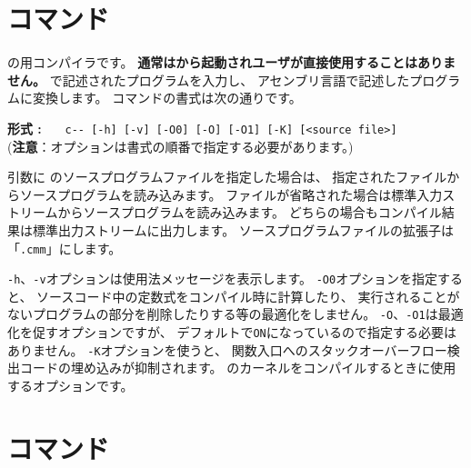 \section{{\cmmc}コマンド}
\label{command:cmmc}

{\cmml}の{\tac}用コンパイラです。
{\bf 通常は{\cme}から起動されユーザが直接使用することはありません。}
\cmml で記述されたプログラムを入力し、
\tac アセンブリ言語で記述したプログラムに変換します。
\cmmc コマンドの書式は次の通りです。

\begin{flushleft}
{\bf 形式 : }~~~\verb/c-- [-h] [-v] [-O0] [-O] [-O1] [-K] [<source file>]/\\
({\bf 注意}：オプションは書式の順番で指定する必要があります。)
\end{flushleft}

引数に \cmml のソースプログラムファイルを指定した場合は、
指定されたファイルからソースプログラムを読み込みます。
ファイルが省略された場合は標準入力ストリームからソースプログラムを読み込みます。
どちらの場合もコンパイル結果は標準出力ストリームに出力します。
ソースプログラムファイルの拡張子は「\verb/.cmm/」にします。

\verb/-h/、\verb/-v/オプションは使用法メッセージを表示します。
\verb/-O0/オプションを指定すると、
ソースコード中の定数式をコンパイル時に計算したり、
実行されることがないプログラムの部分を削除したりする等の最適化をしません。
\verb/-O/、\verb/-O1/は最適化を促すオプションですが、
デフォルトで\verb/ON/になっているので指定する必要はありません。
\verb/-K/オプションを使うと、
関数入口へのスタックオーバーフロー検出コードの埋め込みが抑制されます。
\tacos のカーネルをコンパイルするときに使用するオプションです。

%
%

\section{{\ccmmc}コマンド}
\label{command:ccmmc}

